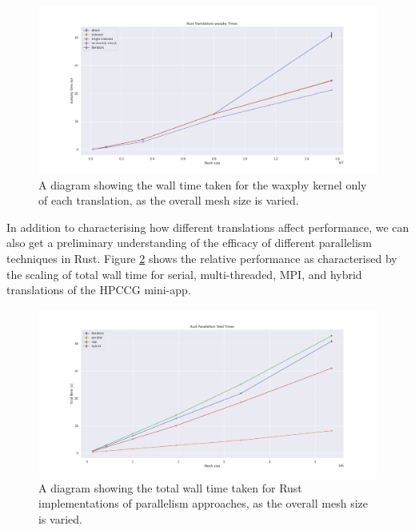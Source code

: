 \begin{figure}[H]
    \centering
    \includegraphics[width=\textwidth]{images/3_translation/performance/translations_waxpby_line.png}
    \caption{A diagram showing the wall time taken for the waxpby kernel only of each translation, as the overall mesh size is varied.}
    \label{fig:translations_waxpby_line}
\end{figure}

In addition to characterising how different translations affect performance, we can also get a preliminary understanding of the efficacy of different parallelism techniques in Rust. Figure \ref{fig:translation_parallelism_rust} shows the relative performance as characterised by the scaling of total wall time for serial, multi-threaded, MPI, and hybrid translations of the HPCCG mini-app.

\begin{figure}[H]
    \centering
    \includegraphics[width=\textwidth]{images/3_translation/performance/translation_parallelism_rust.png}
    \caption{A diagram showing the total wall time taken for Rust implementations of parallelism approaches, as the overall mesh size is varied.}
    \label{fig:translation_parallelism_rust}
\end{figure}

